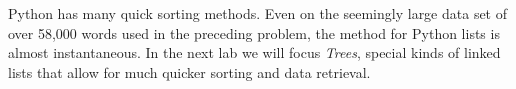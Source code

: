 Python has many quick sorting methods.
Even on the seemingly large data set of over 58,000 words used in the preceding problem, the  method for Python lists is almost instantaneous.
In the next lab we will focus \emph{Trees}, special kinds of linked lists that allow for much quicker sorting and data retrieval.



